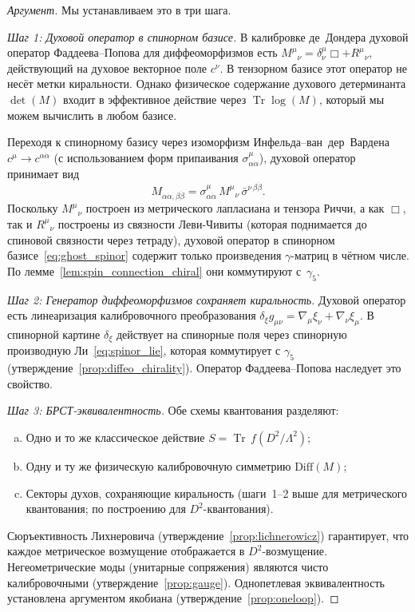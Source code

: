 \documentclass[12pt,a4paper]{article}
\theoremstyle{definition}
\theoremstyle{remark}
\newcommand{\Tr}{\operatorname{Tr}}
\newcommand{\Lam}{\Lambda}
\begin{document}
\begin{proof}[Аргумент]
Мы устанавливаем это в три шага.

\smallskip\noindent\emph{Шаг 1: Духовой оператор в спинорном базисе.}
В калибровке де~Дондера духовой оператор Фаддеева--Попова для
диффеоморфизмов есть $M^\mu{}_\nu = \delta^\mu_\nu\Box + R^\mu{}_\nu$,
действующий на духовое векторное поле $c^\nu$.  В тензорном базисе
этот оператор не несёт метки киральности.  Однако физическое содержание
духового детерминанта $\det(M)$ входит в эффективное действие через
$\Tr\log(M)$, который мы можем вычислить в любом базисе.

Переходя к спинорному базису через изоморфизм
Инфельда--ван~дер~Вардена $c^\mu \to c^{\alpha\dot\alpha}$
(с использованием форм припаивания $\sigma^\mu_{\alpha\dot\alpha}$),
духовой оператор принимает вид
\begin{equation}\label{eq:ghost_spinor}
  M_{\alpha\dot\alpha,\beta\dot\beta}
  = \sigma^\mu_{\alpha\dot\alpha}\,M^\mu{}_\nu\,
    \bar\sigma^{\nu\,\beta\dot\beta}.
\end{equation}
Поскольку $M^\mu{}_\nu$ построен из метрического лапласиана и тензора
Риччи, а как $\Box$, так и $R^\mu{}_\nu$ построены из связности
Леви-Чивиты (которая поднимается до спиновой связности через
тетраду), духовой оператор в спинорном
базисе~\eqref{eq:ghost_spinor} содержит только произведения
$\gamma$-матриц в чётном числе.  По
лемме~\ref{lem:spin_connection_chiral} они коммутируют с~$\gamma_5$.

\smallskip\noindent\emph{Шаг 2: Генератор диффеоморфизмов сохраняет
киральность.}
Духовой оператор есть линеаризация калибровочного преобразования
$\delta_\xi g_{\mu\nu} = \nabla_\mu\xi_\nu + \nabla_\nu\xi_\mu$.
В спинорной картине $\delta_\xi$ действует на спинорные поля через
спинорную производную Ли~\eqref{eq:spinor_lie}, которая коммутирует
с $\gamma_5$ (утверждение~\ref{prop:diffeo_chirality}).  Оператор
Фаддеева--Попова наследует это свойство.

\smallskip\noindent\emph{Шаг 3: БРСТ-эквивалентность.}
Обе схемы квантования разделяют:
\begin{enumerate}[(a)]
  \item Одно и то же классическое действие $S = \Tr\,f(D^2/\Lam^2)$;
  \item Одну и ту же физическую калибровочную симметрию $\mathrm{Diff}(M)$;
  \item Секторы духов, сохраняющие киральность (шаги~1--2 выше для
        метрического квантования; по построению для $D^2$-квантования).
\end{enumerate}
Сюръективность Лихнеровича (утверждение~\ref{prop:lichnerowicz})
гарантирует, что каждое метрическое возмущение отображается в
$D^2$-возмущение.  Негеометрические моды (унитарные сопряжения)
являются чисто калибровочными
(утверждение~\ref{prop:gauge}).  Однопетлевая эквивалентность
установлена аргументом якобиана (утверждение~\ref{prop:oneloop}).


\end{proof}
\end{document}
